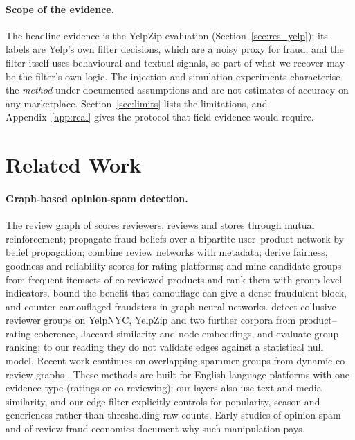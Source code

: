\documentclass[pdflatex,sn-basic]{sn-jnl}
\theoremstyle{thmstyleone}
\theoremstyle{thmstylethree}
\begin{document}
\paragraph{Scope of the evidence.} The headline evidence is the YelpZip evaluation (Section~\ref{sec:res_yelp}); its labels are Yelp's own filter decisions, which are a noisy proxy for fraud, and the filter itself uses behavioural and textual signals, so part of what we recover may be the filter's own logic. The injection and simulation experiments characterise the \emph{method} under documented assumptions and are not estimates of accuracy on any marketplace. Section~\ref{sec:limits} lists the limitations, and Appendix~\ref{app:real} gives the protocol that field evidence would require.

\section{Related Work}\label{sec:related}

\paragraph{Graph-based opinion-spam detection.} The review graph of \citet{wang2011} scores reviewers, reviews and stores through mutual reinforcement; \citet{akoglu2013} propagate fraud beliefs over a bipartite user--product network by belief propagation; \citet{rayana2015} combine review networks with metadata; \citet{kumar2018} derive fairness, goodness and reliability scores for rating platforms; and \citet{mukherjee2012} mine candidate groups from frequent itemsets of co-reviewed products and rank them with group-level indicators. \citet{hooi2016} bound the benefit that camouflage can give a dense fraudulent block, and \citet{dou2020} counter camouflaged fraudsters in graph neural networks. \citet{dhawan2019} detect collusive reviewer groups on YelpNYC, YelpZip and two further corpora from product--rating coherence, Jaccard similarity and node embeddings, and evaluate group ranking; to our reading they do not validate edges against a statistical null model. Recent work continues on overlapping spammer groups from dynamic co-review graphs \citep{wang2024cybersec}. These methods are built for English-language platforms with one evidence type (ratings or co-reviewing); our layers also use text and media similarity, and our edge filter explicitly controls for popularity, season and genericness rather than thresholding raw counts. Early studies of opinion spam \citep{jindal2008} and of review fraud economics \citep{luca2016} document why such manipulation pays.
\end{document}
